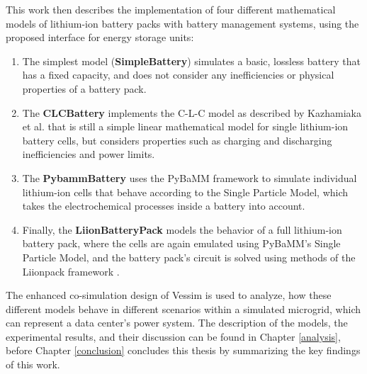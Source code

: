 This work then describes the implementation of four different mathematical models of lithium-ion battery packs with battery management systems, using the proposed interface for energy storage units:
\begin{enumerate}
    \item The simplest model (\textbf{SimpleBattery}) simulates a basic, lossless battery that has a fixed capacity, and does not consider any inefficiencies or physical properties of a battery pack.
    \item The \textbf{CLCBattery} implements the C-L-C model as described by Kazhamiaka et al. \cite{kazhamiaka2019tractable} that is still a simple linear mathematical model for single lithium-ion battery cells, but considers properties such as charging and discharging inefficiencies and power limits.
    \item The \textbf{PybammBattery} uses the PyBaMM framework \cite{pybammbatteries} to simulate individual lithium-ion cells that behave according to the Single Particle Model, which takes the electrochemical processes inside a battery into account.
    \item Finally, the \textbf{LiionBatteryPack} models the behavior of a full lithium-ion battery pack, where the cells are again emulated using PyBaMM's Single Particle Model, and the battery pack's circuit is solved using methods of the Liionpack framework \cite{tranter2022liionpack}.
\end{enumerate}

The enhanced co-simulation design of Vessim \cite{vessim} is used to analyze, how these different models behave in different scenarios within a simulated microgrid, which can represent a data center's power system. The description of the models, the experimental results, and their discussion can be found in Chapter \ref{analysis}, before Chapter \ref{conclusion} concludes this thesis by summarizing the key findings of this work.
